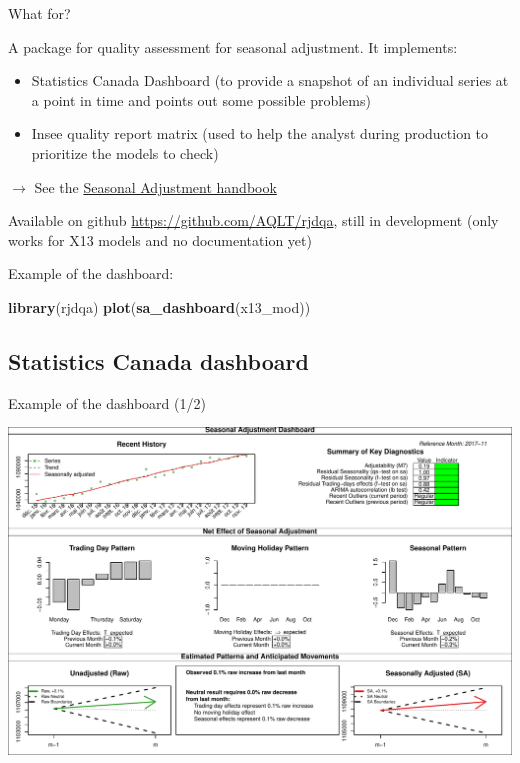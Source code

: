 \documentclass[10pt,xcolor=table,color={dvipsnames,usenames},ignorenonframetext,usepdftitle=false,french]{beamer}
\newenvironment{Shaded}{\begin{snugshade}}{\end{snugshade}}
\newcommand{\KeywordTok}[1]{\textcolor[rgb]{0.13,0.29,0.53}{\textbf{#1}}}
\newcommand{\NormalTok}[1]{#1}
\begin{document}
\begin{frame}[fragile]{What for?}

A package for quality assessment for seasonal adjustment. It implements:

\begin{itemize}
\item
  Statistics Canada Dashboard (to provide a snapshot of an individual
  series at a point in time and points out some possible problems)
\item
  Insee quality report matrix (used to help the analyst during
  production to prioritize the models to check)
\end{itemize}

\(\rightarrow\) See the
\href{https://ec.europa.eu/eurostat/web/products-manuals-and-guidelines/-/KS-GQ-18-001?inheritRedirect=true}{Seasonal
Adjustment handbook}

Available on github \url{https://github.com/AQLT/rjdqa}, still in
development (only works for X13 models and no documentation yet)

Example of the dashboard:

\begin{Shaded}
\begin{Highlighting}[]
\KeywordTok{library}\NormalTok{(rjdqa)}
\KeywordTok{plot}\NormalTok{(}\KeywordTok{sa_dashboard}\NormalTok{(x13_mod))}
\end{Highlighting}
\end{Shaded}

\end{frame}

\subsection{Statistics Canada
dashboard}\label{statistics-canada-dashboard}

\begin{frame}{Example of the dashboard (1/2)}

\footnotesize
\includegraphics{rjdemetra_files/figure-beamer/unnamed-chunk-17-1.pdf}

\end{frame}
\end{document}

